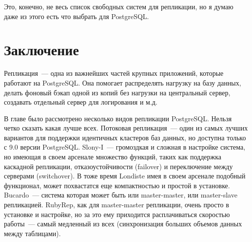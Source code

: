 Это, конечно, не весь список свободных систем для репликации, но я думаю даже из этого есть что выбрать для PostgreSQL.










\section{Заключение}

Репликация~--- одна из важнейших частей крупных приложений, которые работают на PostgreSQL. Она помогает распределять нагрузку на базу данных, делать фоновый бэкап одной из копий без нагрузки на центральный сервер, создавать отдельный сервер для логирования и м.д.

В главе было рассмотрено несколько видов репликации PostgreSQL. Нельзя четко сказать какая лучше всех. Потоковая репликация~--- один из самых лучших вариантов для поддержки идентичных кластеров баз данных, но доступна только с 9.0 версии PostgreSQL. Slony-I~--- громоздкая и сложная в настройке система, но имеющая в своем арсенале множество функций, таких как поддержка каскадной репликации, отказоустойчивости (failover) и переключение между серверами (switchover). В тоже время Londiste имея в своем арсенале подобный функционал, может похвастатся еще компактностью и простой в установке. Bucardo~--- система которая может быть или master-master, или master-slave репликацией. RubyRep, как для master-master репликации, очень просто в установке и настройке, но за это ему приходится расплачиваться скоростью работы~--- самый медленный из всех (синхронизация больших объемов данных между таблицами).
